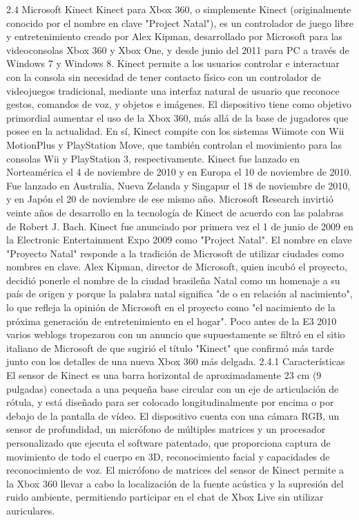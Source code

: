 2.4	Microsoft Kinect
Kinect para Xbox 360, o simplemente Kinect (originalmente conocido por el nombre en clave "Project Natal"), es un controlador de juego libre y entretenimiento creado por Alex Kipman, desarrollado por Microsoft para las videoconsolas Xbox 360 y Xbox One, y desde junio del 2011 para PC a través de Windows 7 y Windows 8.
Kinect permite a los usuarios controlar e interactuar con la consola sin necesidad de tener contacto físico con un controlador de videojuegos tradicional, mediante una interfaz natural de usuario que reconoce gestos, comandos de voz, y objetos e imágenes. El dispositivo tiene como objetivo primordial aumentar el uso de la Xbox 360, más allá de la base de jugadores que posee en la actualidad.
En sí, Kinect compite con los sistemas Wiimote con Wii MotionPlus y PlayStation Move, que también controlan el movimiento para las consolas Wii y PlayStation 3, respectivamente.
Kinect fue lanzado en Norteamérica el 4 de noviembre de 2010 y en Europa el 10 de noviembre de 2010. Fue lanzado en Australia, Nueva Zelanda y Singapur el 18 de noviembre de 2010, y en Japón el 20 de noviembre de ese mismo año. Microsoft Research invirtió veinte años de desarrollo en la tecnología de Kinect de acuerdo con las palabras de Robert J. Bach. Kinect fue anunciado por primera vez el 1 de junio de 2009 en la Electronic Entertainment Expo 2009 como "Project Natal".
El nombre en clave "Proyecto Natal" responde a la tradición de Microsoft de utilizar ciudades como nombres en clave. Alex Kipman, director de Microsoft, quien incubó el proyecto, decidió ponerle el nombre de la ciudad brasileña Natal como un homenaje a su país de origen y porque la palabra natal significa "de o en relación al nacimiento", lo que refleja la opinión de Microsoft en el proyecto como "el nacimiento de la próxima generación de entretenimiento en el hogar". Poco antes de la E3 2010 varios weblogs tropezaron con un anuncio que supuestamente se filtró en el sitio italiano de Microsoft de que sugirió el título "Kinect" que confirmó más tarde junto con los detalles de una nueva Xbox 360 más delgada.
2.4.1	Características
El sensor de Kinect es una barra horizontal de aproximadamente 23 cm (9 pulgadas) conectada a una pequeña base circular con un eje de articulación de rótula, y está diseñado para ser colocado longitudinalmente por encima o por debajo de la pantalla de vídeo.
El dispositivo cuenta con una cámara RGB, un sensor de profundidad, un micrófono de múltiples matrices y un procesador personalizado que ejecuta el software patentado, que proporciona captura de movimiento de todo el cuerpo en 3D, reconocimiento facial y capacidades de reconocimiento de voz. El micrófono de matrices del sensor de Kinect permite a la Xbox 360 llevar a cabo la localización de la fuente acústica y la supresión del ruido ambiente, permitiendo participar en el chat de Xbox Live sin utilizar auriculares.
